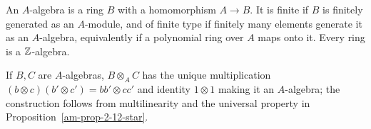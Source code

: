\begin{definition}
\label{am-def-algebra}
\uses{}
An $A$-algebra is a ring $B$ with a homomorphism $A\to B$.  It is finite if
$B$ is finitely generated as an $A$-module, and of finite type if finitely many
elements generate it as an $A$-algebra, equivalently if a polynomial ring over
$A$ maps onto it.  Every ring is a $\mathbb Z$-algebra.
\end{definition}
\begin{remark}
\label{am-rem-tensor-algebra}
\uses{}
If $B,C$ are $A$-algebras, $B\otimes_A C$ has the unique multiplication
$(b\otimes c)(b'\otimes c')=bb'\otimes cc'$ and identity $1\otimes1$ making
it an $A$-algebra; the construction follows from multilinearity and the
universal property in Proposition~\ref{am-prop-2-12-star}.
\end{remark}
